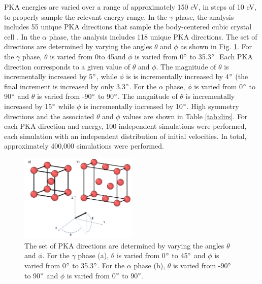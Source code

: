 \documentclass[review]{elsarticle}
\begin{document}
PKA energies are varied over a range of approximately 150 eV, in steps of 10 eV, to properly sample the relevant energy range. In the $\gamma$ phase, the analysis includes 55 unique PKA directions that sample the body-centered cubic crystal cell \cite{beeler2015}. In the $\alpha$ phase, the analysis includes 118 unique PKA directions. The set of directions are determined by varying the angles $\theta$ and $\phi$ as shown in Fig. \ref{fig:directions}. For the $\gamma$ phase, $\theta$ is varied from 0\degree to 45\degree and $\phi$ is varied from 0$\degree$ to 35.3$\degree$. Each PKA direction corresponds to a given value of $\theta$ and $\phi$. The magnitude of $\theta$ is incrementally increased by 5$\degree$, while $\phi$ is is incrementally increased by 4$\degree$ (the final increment is increased by only 3.3$\degree$. For the $\alpha$ phase, $\phi$ is varied from 0$\degree$ to 90$\degree$ and $\theta$ is varied from -90$\degree$ to 90$\degree$. The magnitude of $\theta$ is incrementally increased by 15$\degree$  while $\phi$ is incrementally increased by 10$\degree$. High symmetry directions and the associated $\theta$ and $\phi$ values are shown in Table \ref{tab:dirs}. For each PKA direction and energy, 100 independent simulations were performed, each simulation with an independent distribution of initial velocities. In total, approximately 400,000 simulations were performed. 



\begin{figure}[h]
 \centering
 \includegraphics[width=0.5\textwidth]{directionsD.png} 
 \caption{The set of PKA directions are determined by varying the angles $\theta$ and $\phi$. For the $\gamma$ phase (a), $\theta$ is varied from 0$\degree$ to 45$\degree$ and $\phi$ is varied from 0$\degree$ to 35.3$\degree$. For the $\alpha$ phase (b), $\theta$ is varied from -90$\degree$ to 90$\degree$ and $\phi$ is varied from 0$\degree$ to 90$\degree$.}
 \label{fig:directions}
\end{figure}
\end{document}
